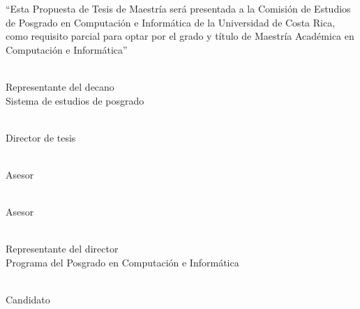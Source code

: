 ``Esta Propuesta de Tesis de Maestría será presentada a la Comisión de Estudios de Posgrado en Computación e Informática de la Universidad de Costa Rica, como requisito parcial para optar por el grado y título de Maestría Académica en Computación e Informática''


\begin{center}

    \signature{Nombre del representante}\\
    \vspace{0.5cm}
    Representante del decano\\
    Sistema de estudios de posgrado
    \vspace{0.70cm}


    \signature{Dr. Esteban Meneses}\\
    \vspace{0.5cm}
    Director de tesis
    \vspace{0.70cm}
    
    \signature{Dr. Silvio Rizzi}\\
    \vspace{0.5cm}
    Asesor
    \vspace{0.70cm}

    \signature{Dr. Edgar Casasola}\\
    \vspace{0.5cm}
    Asesor
    \vspace{0.70cm}

    \signature{Nombre del representante}\\
    \vspace{0.5cm}
    Representante del director\\
    Programa del Posgrado en Computación e Informática
    \vspace{0.70cm}

    \signature{Christian Asch}\\
    \vspace{0.5cm}
    Candidato

    
\end{center}